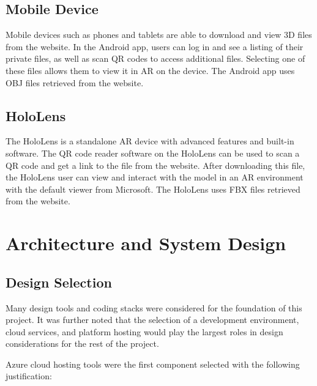 \subsection{Mobile Device}
Mobile devices such as phones and tablets are able to download and view 3D files from the website. In the Android app, users can log in and see a listing of their private files, as well as scan QR codes to access additional files. Selecting one of these files allows them to view it in AR on the device. The Android app uses OBJ files retrieved from the website.

\subsection{HoloLens}
The HoloLens is a standalone AR device with advanced features and built-in software. The QR code reader software on the HoloLens can be used to scan a QR code and get a link to the file from the website. After downloading this file, the HoloLens user can view and interact with the model in an AR environment with the default viewer from Microsoft. The HoloLens uses FBX files retrieved from the website.

 \section{Architecture and System Design}
 
 
 
   \subsection{Design Selection}
 Many design tools and coding stacks were considered for the foundation of this project. It was further noted that the selection of a development environment, cloud services, and platform hosting would play the largest roles in design considerations for the rest of the project. 
 
 Azure cloud hosting tools were the first component selected with the following justification: 

